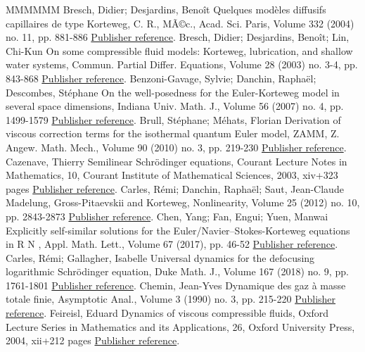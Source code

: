 \begin{thebibliography}{MMMMMM}
 Bresch, Didier; Desjardins, Benoît Quelques modèles diffusifs capillaires de type Korteweg, C. R., MÃ©c., Acad. Sci. Paris, Volume 332 (2004) no. 11, pp. 881-886 \href{https://ahl.centre-mersenne.org/item/AHL_2018__1__47_0/#BD04}{Publisher reference}.
 Bresch, Didier; Desjardins, Benoît; Lin, Chi-Kun On some compressible fluid models: Korteweg, lubrication, and shallow water systems, Commun. Partial Differ. Equations, Volume 28 (2003) no. 3-4, pp. 843-868 \href{https://ahl.centre-mersenne.org/item/AHL_2018__1__47_0/#Bre-De-CKL-03}{Publisher reference}.
 Benzoni-Gavage, Sylvie; Danchin, Raphaël; Descombes, Stéphane On the well-posedness for the Euler-Korteweg model in several space dimensions, Indiana Univ. Math. J., Volume 56 (2007) no. 4, pp. 1499-1579 \href{https://ahl.centre-mersenne.org/item/AHL_2018__1__47_0/#BDD07}{Publisher reference}.
 Brull, Stéphane; Méhats, Florian Derivation of viscous correction terms for the isothermal quantum Euler model, ZAMM, Z. Angew. Math. Mech., Volume 90 (2010) no. 3, pp. 219-230 \href{https://ahl.centre-mersenne.org/item/AHL_2018__1__47_0/#Bru-Me10}{Publisher reference}.
 Cazenave, Thierry Semilinear Schrödinger equations, Courant Lecture Notes in Mathematics, 10, Courant Institute of Mathematical Sciences, 2003, xiv+323 pages \href{https://ahl.centre-mersenne.org/item/AHL_2018__1__47_0/#CazCourant}{Publisher reference}.
 Carles, Rémi; Danchin, Raphaël; Saut, Jean-Claude Madelung, Gross-Pitaevskii and Korteweg, Nonlinearity, Volume 25 (2012) no. 10, pp. 2843-2873 \href{https://ahl.centre-mersenne.org/item/AHL_2018__1__47_0/#CaDaSa12}{Publisher reference}.
 Chen, Yang; Fan, Engui; Yuen, Manwai Explicitly self-similar solutions for the Euler/Navier–Stokes-Korteweg equations in R N , Appl. Math. Lett., Volume 67 (2017), pp. 46-52 \href{https://ahl.centre-mersenne.org/item/AHL_2018__1__47_0/#CFY17}{Publisher reference}.
 Carles, Rémi; Gallagher, Isabelle Universal dynamics for the defocusing logarithmic Schrödinger equation, Duke Math. J., Volume 167 (2018) no. 9, pp. 1761-1801 \href{https://ahl.centre-mersenne.org/item/AHL_2018__1__47_0/#CaGa18}{Publisher reference}.
 Chemin, Jean-Yves Dynamique des gaz à masse totale finie, Asymptotic Anal., Volume 3 (1990) no. 3, pp. 215-220 \href{https://ahl.centre-mersenne.org/item/AHL_2018__1__47_0/#JYC90}{Publisher reference}.
 Feireisl, Eduard Dynamics of viscous compressible fluids, Oxford Lecture Series in Mathematics and its Applications, 26, Oxford University Press, 2004, xii+212 pages \href{https://ahl.centre-mersenne.org/item/AHL_2018__1__47_0/#Fei04}{Publisher reference}.

\end{thebibliography}
